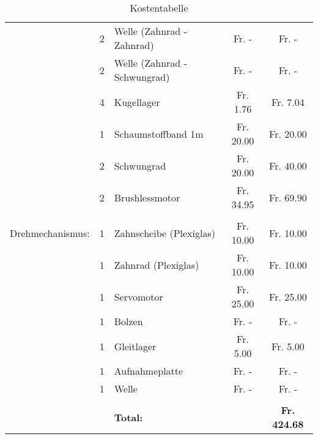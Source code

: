 \begin{table}[h!]
\begin{tabular}{rclcc}
               & 2     & Welle (Zahnrad - Zahnrad) &  Fr. -    &  Fr. -    \\
               & 2     & Welle (Zahnrad - Schwungrad) &  Fr. -    &  Fr. -    \\
          & 4     & Kugellager &  Fr. 1.76  &  Fr. 7.04  \\
          & 1     & Schaumstoffband 1m &  Fr. 20.00  &  Fr. 20.00  \\
          & 2     & Schwungrad &  Fr. 20.00  &  Fr. 40.00  \\
          & 2     & Brushlessmotor &  Fr. 34.95  &  Fr.  69.90  \\
          &       &       &       &  \\
    Drehmechanismus: & 1     & Zahnscheibe (Plexiglas) &  Fr. 10.00  &  Fr. 10.00  \\
          & 1     & Zahnrad (Plexiglas) &  Fr. 10.00  &  Fr. 10.00  \\
          & 1     & Servomotor &  Fr. 25.00  &  Fr. 25.00  \\
          & 1     & Bolzen &  Fr. -    &  Fr. -    \\
          & 1     & Gleitlager &  Fr. 5.00  &  Fr. 5.00  \\
          & 1     & Aufnahmeplatte &  Fr.              -    &  Fr. -    \\
          & 1     & Welle &  Fr. -    &  Fr. -    \\
          &       &       &       &  \\
          &       & \textbf{Total:} & \textbf{} & \textbf{ Fr. 424.68 } \\

    \end{tabular}
    
    
     \caption{Kostentabelle}

\end{table}